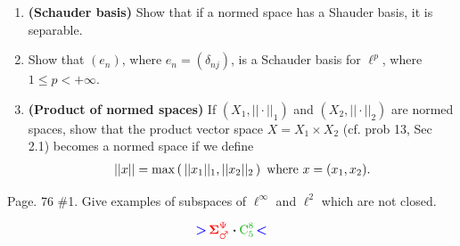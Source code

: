 \documentclass[10pt,a4paper]{report}
\newcommand{\RED}[1]{\textcolor{red}{#1}}
\newcommand{\BLUE}[1]{\textcolor{blue}{#1}}
\newcommand{\GREEN}[1]{\textcolor{black!30!green}{#1}}
\begin{document}
\begin{enumerate}
	\item \textbf{(Schauder basis)} Show that if a normed space has a Shauder basis, it is separable.
	
	\item Show that $(e_n)$, where $e_n=(\delta_{nj})$, is a Schauder basis for $\ell^p$, where $1 \le p < +\infty$.
	
	\setcounter{enumi}{14}
	\item \textbf{(Product of normed spaces)}  If $(X_1,||\cdot||_1)$ and $(X_2, ||\cdot||_2)$ are normed spaces, show that the product vector space $X=X_1\times X_2$ (cf. prob 13, Sec 2.1) becomes a normed space if we define
	\begin{align*}
		 ||x||=\max\left (\, ||x_1||_1, ||x_2||_2 \,\right ) \text{ where } x=(x_1, x_2).
	\end{align*}
\end{enumerate}

\newpage

Page. 76 \#1.  Give examples of subspaces of $\ell^\infty$ and $\ell^2$ which are not closed.

\LARGE{\textbf{$$ \BLUE{\boldsymbol{>}} \, \RED{\boldsymbol{\Sigma}^\Psi_{\male}}  \boldsymbol{\cdot} \GREEN{\text{C}^8_5} \, \BLUE{\boldsymbol{<}} $$}}\\
\end{document}
